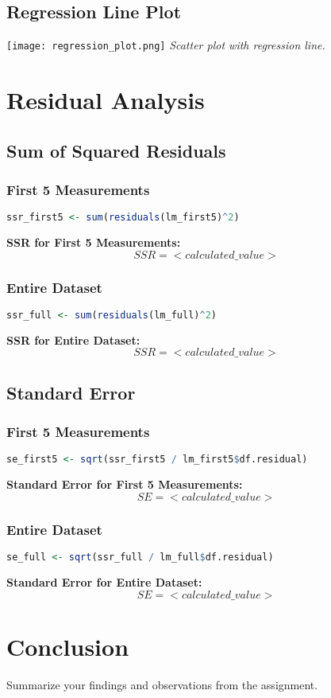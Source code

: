 \documentclass{article}
\begin{document}
\subsection{Regression Line Plot}
\texttt{[image: regression\_plot.png]}
\textit{Scatter plot with regression line.}

\section{Residual Analysis}
\subsection{Sum of Squared Residuals}
\subsubsection{First 5 Measurements}
\begin{lstlisting}[language=R]
ssr_first5 <- sum(residuals(lm_first5)^2)
\end{lstlisting}
\textbf{SSR for First 5 Measurements:} \[ SSR = <calculated\_value> \]

\subsubsection{Entire Dataset}
\begin{lstlisting}[language=R]
ssr_full <- sum(residuals(lm_full)^2)
\end{lstlisting}
\textbf{SSR for Entire Dataset:} \[ SSR = <calculated\_value> \]

\subsection{Standard Error}
\subsubsection{First 5 Measurements}
\begin{lstlisting}[language=R]
se_first5 <- sqrt(ssr_first5 / lm_first5$df.residual)
\end{lstlisting}
\textbf{Standard Error for First 5 Measurements:} \[ SE = <calculated\_value> \]

\subsubsection{Entire Dataset}
\begin{lstlisting}[language=R]
se_full <- sqrt(ssr_full / lm_full$df.residual)
\end{lstlisting}
\textbf{Standard Error for Entire Dataset:} \[ SE = <calculated\_value> \]

\section{Conclusion}
Summarize your findings and observations from the assignment.
\end{document}

